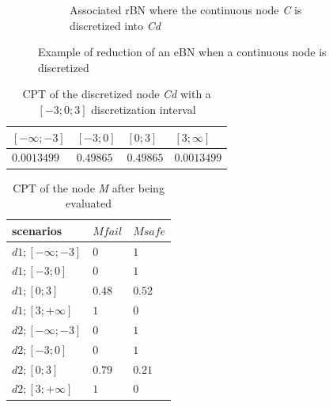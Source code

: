 \begin{figure}[h]
\begin{subfigure}{0.45\textwidth}
        \caption{Associated rBN where the continuous node \textit{C} is discretized into \textit{Cd}}\label{1_rbn_disc_example}
    \end{subfigure}
    \caption{Example of reduction of an eBN when a continuous node is discretized}\label{1_reduction_disc}
\end{figure}

\begin{table}[hbt!]
    \begin{center}
        \caption{CPT of the discretized node \textit{Cd} with a $[-3;0;3]$ discretization interval}\label{exact_disc_tab}
        \begin{tabular}{P{1.5cm}P{1.5cm}P{1.5cm}P{1.5cm}}
            \textbf{$[-\infty;-3]$} & \textbf{$[-3;0]$} & \textbf{$[0;3]$} & \textbf{$[3;\infty]$} \\
            \midrule
            $0.0013499$ & $ 0.49865$ & $ 0.49865$ & $0.0013499$ \\
        \end{tabular}
    \end{center}
\end{table}

\begin{table}[hbt!]
    \begin{center}
        \caption{CPT of the node \textit{M} after being evaluated}\label{Mnode_tab}
        \begin{tabular}{P{2cm}P{2cm}P{2cm}}
            \textbf{scenarios} & \textbf{$M fail$} & \textbf{$M safe$} \\
            \midrule
            $d1;[-\infty;-3]$ & $0$ & $1$ \\
            $d1;[-3;0]$ & $0$ & $1$ \\
            $d1;[0;3]$ & $ 0.48$ & $0.52$ \\
            $d1;[3;+\infty]$ & $ 1$ & $0$ \\
            $d2;[-\infty;-3]$ & $0$ & $1$ \\
            $d2;[-3;0]$ & $0$ & $1$ \\
            $d2;[0;3]$ & $0.79$ & $0.21$ \\
            $d2;[3;+\infty]$ & $1$ & $0$ \\
        \end{tabular}
    \end{center}
\end{table}

